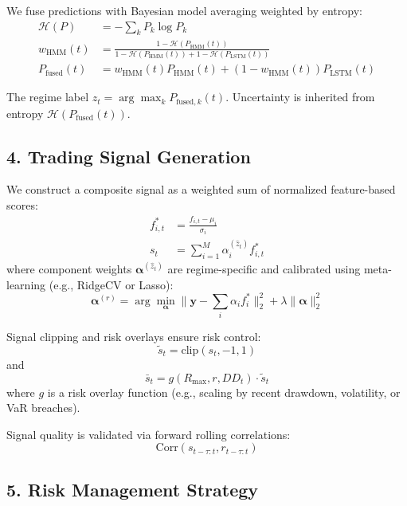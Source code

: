 We fuse predictions with Bayesian model averaging weighted by entropy:
\begin{align}
\mathcal{H}(P) &= - \sum_k P_k \log P_k \\
w_{\mathrm{HMM}}(t) &= \frac{1 - \mathcal{H}(P_{\mathrm{HMM}}(t))}{1 - \mathcal{H}(P_{\mathrm{HMM}}(t)) + 1 - \mathcal{H}(P_{\mathrm{LSTM}}(t))}\\
P_{\text{fused}}(t) &= w_{\text{HMM}}(t) P_{\text{HMM}}(t) + (1 - w_{\text{HMM}}(t)) P_{\text{LSTM}}(t)
\end{align}

The regime label $\hat{z}_t = \arg \max_k P_{\text{fused},k}(t)$. Uncertainty is inherited from entropy $\mathcal{H}(P_{\text{fused}}(t))$.

\subsection{4. Trading Signal Generation}

We construct a composite signal as a weighted sum of normalized feature-based scores:
\begin{align}
f^*_{i,t} &= \frac{f_{i,t} - \mu_i}{\sigma_i} \\
s_t &= \sum_{i=1}^M \alpha^{(\hat{z}_t)}_i f^*_{i,t}
\end{align}
where component weights $\boldsymbol{\alpha}^{(\hat{z}_t)}$ are regime-specific and calibrated using meta-learning (e.g., RidgeCV or Lasso):
\begin{equation}
\boldsymbol{\alpha}^{(r)} = \arg\min_{\boldsymbol{\alpha}} \Big\| \mathbf{y} - \sum_{i} \alpha_i f^*_i \Big\|_2^2 + \lambda \|\boldsymbol{\alpha}\|^2_2
\end{equation}

Signal clipping and risk overlays ensure risk control:
\begin{equation}
\tilde{s}_t = \mathrm{clip}(s_t, -1, 1)
\end{equation}
and
\begin{equation}
\bar{s}_t = g(R_{\max}, r, DD_t) \cdot \tilde{s}_t
\end{equation}
where $g$ is a risk overlay function (e.g., scaling by recent drawdown, volatility, or VaR breaches).

Signal quality is validated via forward rolling correlations:
\begin{equation}
\mathrm{Corr}(s_{t-\tau:t}, r_{t-\tau:t})
\end{equation}

\subsection{5. Risk Management Strategy}

